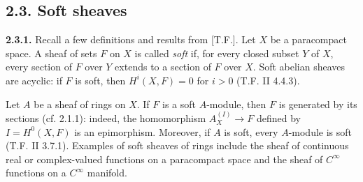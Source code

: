 \documentclass[11pt]{article}
\begin{document}
\subsection*{2.3. Soft sheaves}

\textbf{2.3.1.} Recall a few definitions and results from [T.F.]. Let $X$ be a paracompact space. A sheaf of sets $F$ on $X$ is called \emph{soft} if, for every closed subset $Y$ of $X$, every section of $F$ over $Y$ extends to a section of $F$ over $X$. Soft abelian sheaves are acyclic: if $F$ is soft, then $H^i(X,F)=0$ for $i>0$ (T.F. II 4.4.3).

Let $A$ be a sheaf of rings on $X$. If $F$ is a soft $A$-module, then $F$ is generated by its sections (cf. 2.1.1): indeed, the homomorphism $A_X^{(I)}\to F$ defined by $I=H^0(X,F)$ is an epimorphism. Moreover, if $A$ is soft, every $A$-module is soft (T.F. II 3.7.1). Examples of soft sheaves of rings include the sheaf of continuous real or complex-valued functions on a paracompact space and the sheaf of $C^\infty$ functions on a $C^\infty$ manifold.
\end{document}
